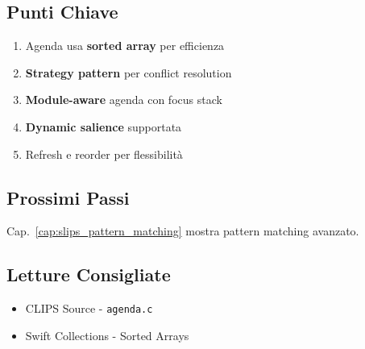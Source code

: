 \subsection{Punti Chiave}

\begin{enumerate}
\item Agenda usa \textbf{sorted array} per efficienza
\item \textbf{Strategy pattern} per conflict resolution
\item \textbf{Module-aware} agenda con focus stack
\item \textbf{Dynamic salience} supportata
\item Refresh e reorder per flessibilità
\end{enumerate}

\subsection{Prossimi Passi}

Cap.~\ref{cap:slips_pattern_matching} mostra pattern matching avanzato.

\subsection{Letture Consigliate}

\begin{itemize}
\item CLIPS Source - \texttt{agenda.c}
\item Swift Collections - Sorted Arrays
\end{itemize}
